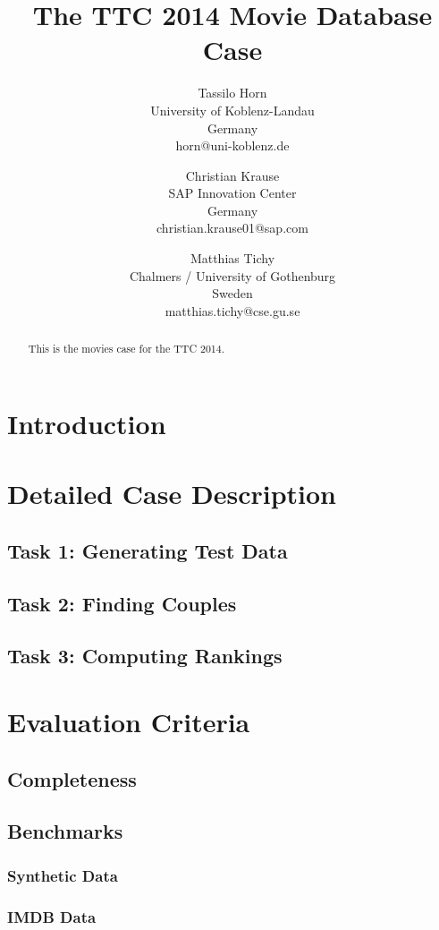 \documentclass[a4paper]{article}
\title{The TTC 2014 Movie Database Case}
\author{
Tassilo Horn\\ University of Koblenz-Landau\\ Germany\\ horn@uni-koblenz.de
\and
Christian Krause\\ SAP Innovation Center\\ Germany\\ christian.krause01@sap.com
\and
Matthias Tichy\\ Chalmers / University of Gothenburg\\ Sweden\\ matthias.tichy@cse.gu.se
}
\begin{document}
\maketitle

\begin{abstract}
This is the movies case for the TTC 2014.
\end{abstract}
\vskip 32pt


\section{Introduction}

\cite{IMDB2EMF}

\section{Detailed Case Description}

\subsection{Task 1: Generating Test Data}

\subsection{Task 2: Finding Couples}

\subsection{Task 3: Computing Rankings}

\section{Evaluation Criteria}

\subsection{Completeness}

\subsection{Benchmarks}

\subsubsection{Synthetic Data}

\subsubsection{IMDB Data}



\end{document}

